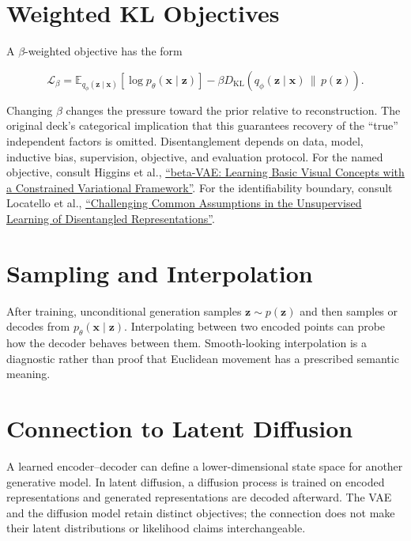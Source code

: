 \documentclass{article}
\begin{document}

\section{Weighted KL Objectives}

A $\beta$-weighted objective has the form

\[
\mathcal{L}_{\beta}
=\mathbb{E}_{q_{\phi}(\mathbf{z}\mid\mathbf{x})}
[\log p_{\theta}(\mathbf{x}\mid\mathbf{z})]
-\beta D_{\mathrm{KL}}\!\left(
q_{\phi}(\mathbf{z}\mid\mathbf{x})\,\|\,p(\mathbf{z})
\right).
\]

Changing $\beta$ changes the pressure toward the prior relative to reconstruction.
The original deck's categorical implication that this guarantees recovery of the
``true'' independent factors is omitted. Disentanglement depends on data, model,
inductive bias, supervision, objective, and evaluation protocol.
For the named objective, consult Higgins et al.,
\href{https://openreview.net/forum?id=Sy2fzU9gl}
{``beta-VAE: Learning Basic Visual Concepts with a Constrained Variational
Framework''}. For the identifiability boundary, consult Locatello et al.,
\href{https://proceedings.mlr.press/v97/locatello19a.html}
{``Challenging Common Assumptions in the Unsupervised Learning of Disentangled
Representations''}.

\section{Sampling and Interpolation}

After training, unconditional generation samples
$\mathbf{z}\sim p(\mathbf{z})$ and then samples or decodes from
$p_{\theta}(\mathbf{x}\mid\mathbf{z})$. Interpolating between two encoded points can
probe how the decoder behaves between them. Smooth-looking interpolation is a
diagnostic rather than proof that Euclidean movement has a prescribed semantic
meaning.


\section{Connection to Latent Diffusion}

A learned encoder--decoder can define a lower-dimensional state space for another
generative model. In latent diffusion, a diffusion process is trained on encoded
representations and generated representations are decoded afterward. The VAE and the
diffusion model retain distinct objectives; the connection does not make their latent
distributions or likelihood claims interchangeable.
\end{document}

